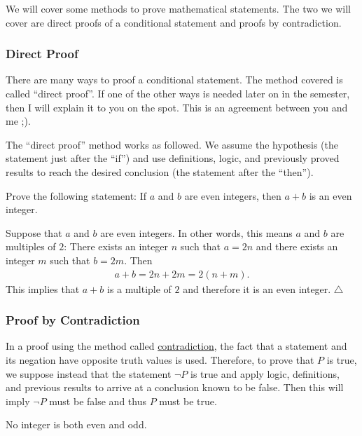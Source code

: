 We will cover some methods to prove mathematical statements. The two we will cover are direct proofs of a conditional statement and proofs by contradiction.


\subsubsection*{Direct Proof}
There are many ways to proof a conditional statement. The method covered is called ``direct proof''. If one of the other ways is needed later on in the semester, then I will explain it to you on the spot. This is an agreement between you and me ;).

The ``direct proof'' method works as followed. We assume the hypothesis (the statement just after the ``if'') and use definitions, logic, and previously proved results to reach the desired conclusion (the statement after the ``then'').

\begin{example}
Prove the following statement: If $a$ and $b$ are even integers, then $a + b$ is an even integer.
\end{example}

\begin{sol*}
Suppose that $a$ and $b$ are even integers. In other words, this means $a$ and $b$ are multiples of $2$: There exists an integer $n$ such that $a = 2 n$ and there exists an integer $m$ such that $b = 2 m$. Then
	\begin{align*}
	a + b = 2n + 2m = 2 (n + m) .
	\end{align*}
This implies that $a + b$ is a multiple of $2$ and therefore it is an even integer. \hfill $\triangle$
\end{sol*}

\subsubsection*{Proof by Contradiction}
In a proof using the method called \underline{contradiction}, the fact that a statement and its negation have opposite truth values is used. Therefore, to prove that $P$ is true, we suppose instead that the statement $\neg P$ is true and apply logic, definitions, and previous results to arrive at a conclusion known to be false. Then this will imply $\neg P$ must be false and thus $P$ must be true.

\begin{example}\label{Ex:NoIntIsOddAndEven}
No integer is both even and odd.
\end{example}

